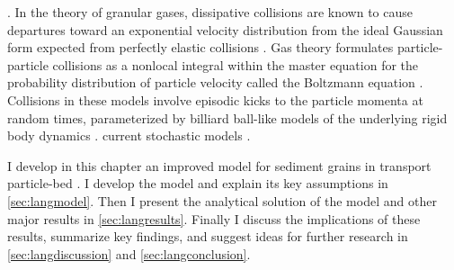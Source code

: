 \DIFaddend . 
In the theory of \DIFaddbegin {}\DIFaddend granular gases, dissipative collisions are known to cause departures toward an exponential velocity distribution from the ideal Gaussian form expected from perfectly elastic collisions \citep{Brilliantov2004}.
Gas theory formulates particle-particle collisions as a nonlocal integral within the master equation for the probability distribution of particle velocity called the Boltzmann equation \DIFdelbegin {}\DIFdelend \DIFaddbegin {}\DIFaddend .
Collisions in these models involve episodic kicks to the particle momenta at random times, \DIFaddbegin {}\DIFaddend parameterized by billiard ball-like models of the underlying rigid body dynamics \citep[e.g.][]{Brach1989}.
\DIFdelbegin {}\DIFdelend \DIFaddbegin {}\DIFaddend current stochastic models \DIFdelbegin {}\DIFdelend \DIFaddbegin {}\DIFaddend .

\DIFdelbegin {}\DIFdelend I develop in this chapter an improved model for sediment grains in transport \DIFdelbegin {}\DIFdelend \DIFaddbegin {}\DIFaddend particle-bed \DIFdelbegin {}\DIFdelend \DIFaddbegin {}\DIFaddend .
I develop the model and explain its key assumptions in \DIFdelbegin {}\DIFdelend \DIFaddbegin {}\DIFaddend \ref{sec:langmodel}. Then I present the analytical solution of the model and other major results in \ref{sec:langresults}. Finally I discuss the implications of these results, summarize key findings, and suggest ideas for further research in \DIFdelbegin {}\DIFdelend \DIFaddbegin {}\DIFaddend \ref{sec:langdiscussion} and \ref{sec:langconclusion}.


